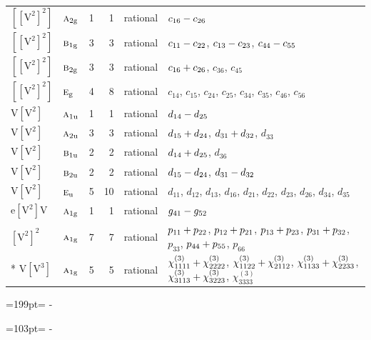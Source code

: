 \documentclass[10pt,a4paper]{article}
\newcommand{\needspace}[1]{\par\penalty-100\begingroup\dimen0=#1\relax\dimen2=\pagegoal
  \advance\dimen2-\pagetotal\ifdim\dimen0>\dimen2\relax\ifdim\dimen2>0pt\vfil\break\fi\fi
  \endgroup}
\numberwithin{equation}{section}
\newcommand{\irr}[1]{\text{\normalfont\scshape #1}}
\newcommand{\ptag}[1]{\mathrm{#1}}
\newcommand{\jahn}[1]{\mathrm{#1}}
\newlength{\fillwidth}\newlength{\cellwidth}\newlength{\colwidth}
\newcommand{\signbreak}{\penalty100\relax}
\begin{document}
{\begin{longtable}{@{}llrrl>{\RaggedRight\arraybackslash}p{\fillwidth}@{}}
$\jahn{[[V^{2}]^{2}]}$ & $\irr{a}_{2\ptag{g}}$ & 1 & 1 & rational & $c_{16} -\signbreak c_{26}$\\
$\jahn{[[V^{2}]^{2}]}$ & $\irr{b}_{1\ptag{g}}$ & 3 & 3 & rational & $c_{11} -\signbreak c_{22}$, $c_{13} -\signbreak c_{23}$, $c_{44} -\signbreak c_{55}$\\
$\jahn{[[V^{2}]^{2}]}$ & $\irr{b}_{2\ptag{g}}$ & 3 & 3 & rational & $c_{16} +\signbreak c_{26}$, $c_{36}$, $c_{45}$\\
$\jahn{[[V^{2}]^{2}]}$ & $\irr{e}_{\ptag{g}}$ & 4 & 8 & rational & $c_{14}$, $c_{15}$, $c_{24}$, $c_{25}$, $c_{34}$, $c_{35}$, $c_{46}$, $c_{56}$\\
$\jahn{V[V^{2}]}$ & $\irr{a}_{1\ptag{u}}$ & 1 & 1 & rational & $d_{14} -\signbreak d_{25}$\\
$\jahn{V[V^{2}]}$ & $\irr{a}_{2\ptag{u}}$ & 3 & 3 & rational & $d_{15} +\signbreak d_{24}$, $d_{31} +\signbreak d_{32}$, $d_{33}$\\
$\jahn{V[V^{2}]}$ & $\irr{b}_{1\ptag{u}}$ & 2 & 2 & rational & $d_{14} +\signbreak d_{25}$, $d_{36}$\\
$\jahn{V[V^{2}]}$ & $\irr{b}_{2\ptag{u}}$ & 2 & 2 & rational & $d_{15} -\signbreak d_{24}$, $d_{31} -\signbreak d_{32}$\\
$\jahn{V[V^{2}]}$ & $\irr{e}_{\ptag{u}}$ & 5 & 10 & rational & $d_{11}$, $d_{12}$, $d_{13}$, $d_{16}$, $d_{21}$, $d_{22}$, $d_{23}$, $d_{26}$, $d_{34}$, $d_{35}$\\
$\jahn{e[V^{2}]V}$ & $\irr{a}_{1\ptag{g}}$ & 1 & 1 & rational & $\mathnormal{g}_{41} -\signbreak \mathnormal{g}_{52}$\\
$\jahn{[V^{2}]^{2}}$ & $\irr{a}_{1\ptag{g}}$ & 7 & 7 & rational & $p_{11} +\signbreak p_{22}$, $p_{12} +\signbreak p_{21}$, $p_{13} +\signbreak p_{23}$, $p_{31} +\signbreak p_{32}$, $p_{33}$, $p_{44} +\signbreak p_{55}$, $p_{66}$\\*
$\jahn{V[V^{3}]}$ & $\irr{a}_{1\ptag{g}}$ & 5 & 5 & rational & $\chi^{(3)}_{1111} +\signbreak \chi^{(3)}_{2222}$, $\chi^{(3)}_{1122} +\signbreak \chi^{(3)}_{2112}$, $\chi^{(3)}_{1133} +\signbreak \chi^{(3)}_{2233}$, $\chi^{(3)}_{3113} +\signbreak \chi^{(3)}_{3223}$, $\chi^{(3)}_{3333}$\\
\bottomrule\end{longtable}}
\needspace{199pt}
\needspace{103pt}
\end{document}
